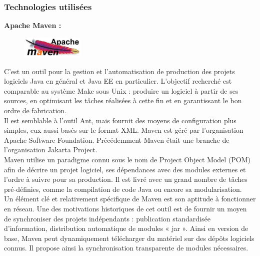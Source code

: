 \begin{itemize}
\subsubsection{Technologies utilisées}

\textbf{Apache Maven : } \label{Maven}

\begin{figure}
\centering
\includegraphics[width=3cm]{images/apacheMaven.jpg}
\end{figure}
\noindent C'est un outil pour la gestion et l'automatisation de production des projets logiciels Java en général et Java EE en particulier. L'objectif recherché est comparable au système Make sous Unix : produire un logiciel à partir de ses sources, en optimisant les tâches réalisées à cette fin et en garantissant le bon ordre de fabrication.\\
Il est semblable à l'outil Ant, mais fournit des moyens de configuration plus simples, eux aussi basés sur le format XML. Maven est géré par l'organisation Apache Software Foundation. Précédemment Maven était une branche de l'organisation Jakarta Project.\\
Maven utilise un paradigme connu sous le nom de Project Object Model (POM) afin de décrire un projet logiciel, ses dépendances avec des modules externes et l'ordre à suivre pour sa production. Il est livré avec un grand nombre de tâches pré-définies, comme la compilation de code Java ou encore sa modularisation.\\
Un élément clé et relativement spécifique de Maven est son aptitude à fonctionner en réseau. Une des motivations historiques de cet outil est de fournir un moyen de synchroniser des projets indépendants : publication standardisée d'information, distribution automatique de modules « jar ». Ainsi en version de base, Maven peut dynamiquement télécharger du matériel sur des dépôts logiciels connus. Il propose ainsi la synchronisation transparente de modules nécessaires.\\


\end{itemize}

